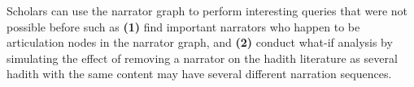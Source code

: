 \documentclass{llncs}
\begin{document}
Scholars can use the narrator graph to perform interesting queries 
that were not possible before such as 
{\bf (1)} find important narrators who happen to be 
articulation nodes in the narrator graph,  and
{\bf (2)} conduct what-if analysis by simulating 
the effect of removing a narrator on the hadith literature
as several hadith with the same content 
may have several different narration sequences. 

%
%
%

\end{document}
